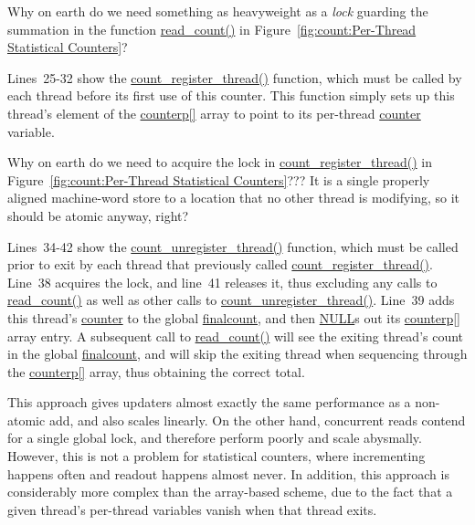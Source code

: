 \QuickQuiz{}
	Why on earth do we need something as heavyweight as a \emph{lock}
	guarding the summation in the function \url{read_count()} in
	Figure~\ref{fig:count:Per-Thread Statistical Counters}?
 \QuickQuizEnd

Lines~25-32 show the \url{count_register_thread()} function, which
must be called by each thread before its first use of this counter.
This function simply sets up this thread's element of the \url{counterp[]}
array to point to its per-thread \url{counter} variable.

\QuickQuiz{}
	Why on earth do we need to acquire the lock in
	\url{count_register_thread()} in
	Figure~\ref{fig:count:Per-Thread Statistical Counters}???
	It is a single properly aligned machine-word store to a location
	that no other thread is modifying, so it should be atomic anyway,
	right?
 \QuickQuizEnd

Lines~34-42 show the \url{count_unregister_thread()} function, which
must be called prior to exit by each thread that previously called
\url{count_register_thread()}.
Line~38 acquires the lock, and line~41 releases it, thus excluding any
calls to \url{read_count()} as well as other calls to
\url{count_unregister_thread()}.
Line~39 adds this thread's \url{counter} to the global \url{finalcount},
and then \url{NULL}s out its \url{counterp[]} array entry.
A subsequent call to \url{read_count()} will see the exiting thread's
count in the global \url{finalcount}, and will skip the exiting thread
when sequencing through the \url{counterp[]} array, thus obtaining
the correct total.

This approach gives updaters almost exactly the same performance as
a non-atomic add, and also scales linearly.
On the other hand, concurrent reads contend for a single global lock,
and therefore perform poorly and scale abysmally.
However, this is not a problem for statistical counters, where incrementing
happens often and readout happens almost never.
In addition, this approach is considerably more complex than the
array-based scheme, due to the fact that a given thread's per-thread
variables vanish when that thread exits.

